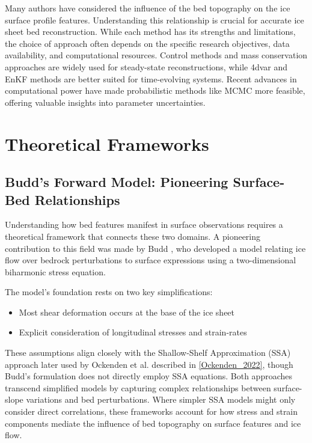 Many authors have considered the influence of the bed topography on the ice surface profile features. Understanding this relationship is crucial for accurate ice sheet bed reconstruction\cite{Budd_1970}. While each method has its strengths and limitations, the choice of approach often depends on the specific research objectives, data availability, and computational resources. Control methods and mass conservation approaches are widely used for steady-state reconstructions, while 4dvar and EnKF methods are better suited for time-evolving systems. Recent advances in computational power have made probabilistic methods like MCMC more feasible, offering valuable insights into parameter uncertainties.

\section{Theoretical Frameworks}
\subsection*{Budd's Forward Model: Pioneering Surface-Bed Relationships}

Understanding how bed features manifest in surface observations requires a theoretical framework that connects these two domains. A pioneering contribution to this field was made by Budd \cite{Budd_1970}, who developed a model relating ice flow over bedrock perturbations to surface expressions using a two-dimensional biharmonic stress equation. 

The model's foundation rests on two key simplifications:
\begin{itemize}
    \item Most shear deformation occurs at the base of the ice sheet
    \item Explicit consideration of longitudinal stresses and strain-rates
\end{itemize}

These assumptions align closely with the Shallow-Shelf Approximation (SSA) approach later used by Ockenden et al. described in \ref{Ockenden_2022}, though Budd's formulation does not directly employ SSA equations. Both approaches transcend simplified models by capturing complex relationships between surface-slope variations and bed perturbations. Where simpler SSA models might only consider direct correlations, these frameworks account for how stress and strain components mediate the influence of bed topography on surface features and ice flow.

